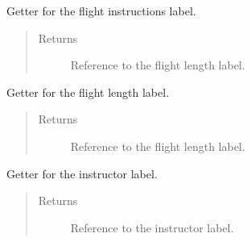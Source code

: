 \documentclass[letterpaper,10pt,english]{sphinxmanual}
\begin{document}
\begin{fulllineitems}
\begin{fulllineitems}
\begin{quote}
\begin{description}
\end{description}\end{quote}

\end{fulllineitems}


\begin{fulllineitems}
\label{\detokenize{index:src.Views.View_ReportScreen.ReportWindow.LblFlightInstructions}}
Getter for the flight instructions label.
\begin{quote}\begin{description}
\item[{Returns}] \leavevmode
Reference to the flight length label.

\end{description}\end{quote}

\end{fulllineitems}


\begin{fulllineitems}
\label{\detokenize{index:src.Views.View_ReportScreen.ReportWindow.LblFlightLength}}
Getter for the flight length label.
\begin{quote}\begin{description}
\item[{Returns}] \leavevmode
Reference to the flight length label.

\end{description}\end{quote}

\end{fulllineitems}


\begin{fulllineitems}
\label{\detokenize{index:src.Views.View_ReportScreen.ReportWindow.LblInstructor}}
Getter for the instructor label.
\begin{quote}\begin{description}
\item[{Returns}] \leavevmode
Reference to the instructor label.


\end{description}
\end{quote}
\end{fulllineitems}
\end{fulllineitems}
\end{document}
